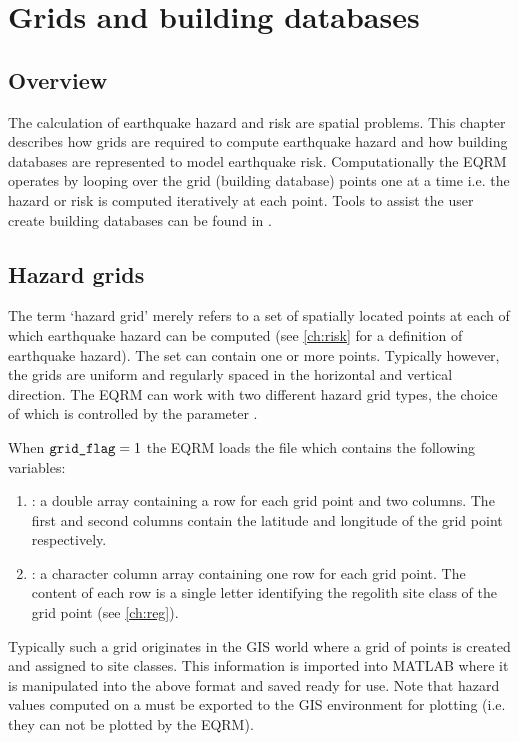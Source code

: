 \chapter{Grids and building databases}
\label{ch:grids}

\section{Overview}

The calculation of earthquake hazard and risk are spatial
problems. This chapter describes how grids are required to compute
earthquake hazard and how building databases are represented to model earthquake risk.
Computationally the EQRM operates by looping over the grid
(building database) points one at a time
i.e. the hazard or risk is computed iteratively at each point.
Tools to assist the user create building databases can be found in .


\section{Hazard grids}

The term `hazard grid' merely refers to a set of spatially located
points at each of which earthquake hazard can be computed (see
\cref{ch:risk} for a definition of earthquake hazard). The set can
contain one or more points. Typically however, the grids are
uniform and regularly spaced in the horizontal and vertical
direction. The EQRM can work with two different hazard grid types,
the choice of which is controlled by the 
parameter .

When $\typepar{grid}{\_}{flag}=1$ the EQRM loads the file
 which contains the
following variables:
\begin{enumerate}
\item {}: a double array
containing a row for each grid point and two columns. The first
and second columns contain the latitude and longitude of the grid
point respectively. \item {}: a
character column array containing one row for each grid point. The
content of each row is a single letter identifying the regolith
site class of the grid point (see \cref{ch:reg}).
\end{enumerate}Typically such a grid originates in the GIS world where a grid of
points is created and assigned to site classes. This information
is imported into MATLAB where it is manipulated into the above
format and saved ready for use. Note that hazard values computed
on a  must be
exported to the GIS environment for plotting (i.e. they can not be
plotted by the EQRM).

